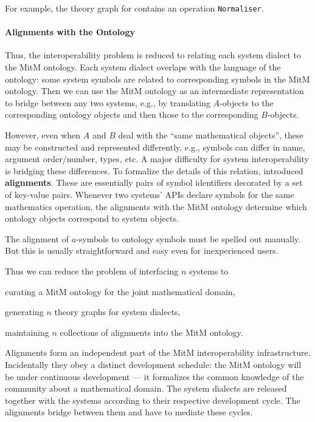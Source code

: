 For example, the theory graph for \GAP contains an operation
\lstinline|Normaliser|.


\paragraph{Alignments with the Ontology}
Thus, the interoperability problem is reduced to relating each system dialect to
the MitM ontology. Each system dialect overlaps with the language of the
ontology: some system symbols are related to corresponding symbols in the MitM
ontology. Then we can use the MitM ontology as an intermediate representation to
bridge between any two systems, e.g., by translating $A$-objects to the
corresponding ontology objects and then those to the corresponding $B$-objects.

However, even when $A$ and $B$ deal with the ``same mathematical objects'', these may be constructed and represented differently, e.g., symbols can differ in name,
argument order/number, types, etc.
A major difficulty for system interoperability is bridging these differences.
To formalize the details of this relation, \cite{MueGauKal:cacfms17} introduced \textbf{\OMMT alignments}.
These are essentially pairs of \OMMT symbol identifiers decorated by a set of key-value pairs.
Whenever two systems' APIs declare symbols for the same mathematics operation, the alignments with the MitM ontology determine which ontology objects correspond to system objects.

The alignment of $a$-symbols to ontology symbols must be spelled out manually.
But this is usually straightforward and easy even for inexperienced users.

Thus we can reduce the problem of interfacing $n$ systems to
\begin{inparaenum}[\em i\rm)]
\item curating a MitM ontology for the joint mathematical domain,
\item generating $n$ theory graphs for system dialects,
\item maintaining $n$ collections of alignments into the MitM ontology.
\end{inparaenum}

Alignments form an independent part of the MitM interoperability infrastructure.
Incidentally they obey a distinct development schedule: the MitM ontology will be under continuous development --- it formalizes the common knowledge of the community about a mathematical domain.
The system dialects are released together with the systems according to their respective development cycle.
The alignments bridge between them and have to mediate these cycles.

